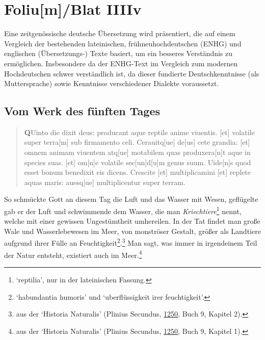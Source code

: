 \documentclass[
]{article}
\author{Dietmar Gerald Schrausser}
\date{09.05.2026}
\begin{document}
\hypertarget{foliumblat-iiiiv}{%
\section{Foliu{[}m{]}/Blat IIIIv}\label{foliumblat-iiiiv}}

Eine zeitgenössische deutsche Übersetzung wird präsentiert, die auf
einem Vergleich der bestehenden lateinischen, frühneuhochdeutschen
(ENHG) und englischen (Übersetzungs-) Texte basiert, um ein besseres
Verständnis zu ermöglichen. Insbesondere da der ENHG-Text im Vergleich
zum modernen Hochdeutschen schwer verständlich ist, da dieser fundierte
Deutschkenntnisse (als Muttersprache) sowie Kenntnisse verschiedener
Dialekte voraussetzt.

\hypertarget{vom-werk-des-fuxfcnften-tages}{%
\subsection{Vom Werk des fünften
Tages}\label{vom-werk-des-fuxfcnften-tages}}

\begin{quote}
\textbf{Q}Uinto die dixit deus: producant aque reptile anime viuentis.
{[}et{]} volatile super terra{[}m{]} sub firmamento celi.
Cerauitq{[}ue{]} de{[}us{]} cete grandia: {[}et{]} omnem animam viuentem
atq{[}ue{]} motabilem quas produxera{[}n{]}t aque in species suas.
{[}et{]} om{[}n{]}e volatile sec{[}un{]}d{[}u{]}m genus suum.
Uide{[}n{]}s quod esset bonum benedixit eis dicens. Crescite {[}et{]}
multiplicamini {[}et{]} replete aquas maris: auesq{[}ue{]}
multiplicentur super terram.
\end{quote}

So schmückte Gott an diesem Tag die Luft und das Wasser mit Wesen,
geflügelte gab er der Luft und schwimmende dem Wasser, die man
\emph{Kriechtiere}\footnote{`reptilia', nur in der lateinischen Fassung.}
nennt, welche mit einer gewissen Ungestümtheit umhereilen. In der Tat
findet man große Wale und Wasserlebewesen im Meer, von monströser
Gestalt, größer als Landtiere aufgrund ihrer Fülle an
Feuchtigkeit\footnote{`habundantia humoris' und `uberflüssigkeit irer
  feuchtigkeit'.}.\footnote{aus der `Historia Naturalis' (Plinius
  Secundus,
  \href{https://gallica.bnf.fr/ark:/12148/btv1b550140045/}{1250}, Buch
  9, Kapitel 2).} Man sagt, was immer in irgendeinem Teil der Natur
entsteht, existiert auch im Meer.\footnote{aus der `Historia Naturalis'
  (Plinius Secundus,
  \href{https://gallica.bnf.fr/ark:/12148/btv1b550140045/}{1250}, Buch
  9, Kapitel 1).}
\end{document}
